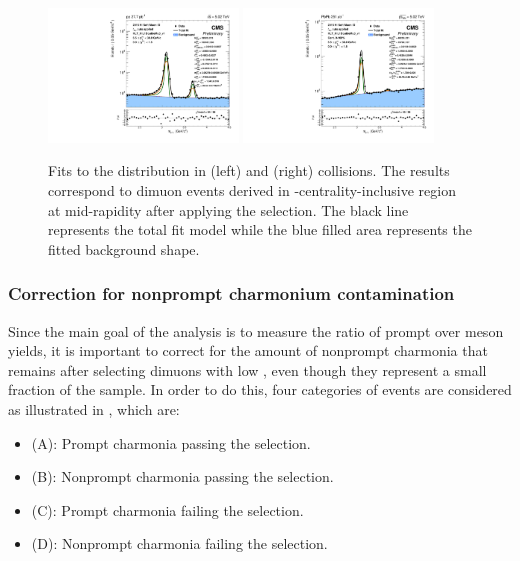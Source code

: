 \begin{figure}[htb!]
 \centering
 \includegraphics[width=0.45\textwidth]{Figures/Charmonia/Analysis/PsiPSignalExtraction/mass/DATA_Psi2SJpsi_PP_Jpsi_DoubleCrystalBall_Psi2S_DoubleCrystalBall_pt65300_rap016_cent0200.pdf}
 \includegraphics[width=0.45\textwidth]{Figures/Charmonia/Analysis/PsiPSignalExtraction/mass/DATA_Psi2SJpsi_PbPb_Jpsi_DoubleCrystalBall_Psi2S_DoubleCrystalBall_pt65300_rap016_cent0200.pdf}
\caption{Fits to the \mMuMu distribution in \Runpp (left) and \RunPbPb (right) collisions. The results correspond to dimuon events derived in \pt-centrality-inclusive region at mid-rapidity after applying the \ctau selection. The black line represents the total fit model while the blue filled area represents the fitted background shape.}
 \label{fig:MassPsiP}
\end{figure}


\subsubsection{Correction for nonprompt charmonium contamination}\label{sec:Charmonia_Analysis_PsiPYieldExtraction_NonPromptCorr}

Since the main goal of the analysis is to measure the ratio of prompt \PsiP over \JPsi meson yields, it is important to correct for the amount of nonprompt charmonia that remains after selecting dimuons with low \ctau, even though they represent a small fraction of the sample. In order to do this, four categories of events are considered as illustrated in , which are:

\begin{itemize}
 \item (A): Prompt charmonia passing the \ctau selection.
 \item (B): Nonprompt charmonia passing the \ctau selection.
 \item (C): Prompt charmonia failing the \ctau selection.
 \item (D): Nonprompt charmonia failing the \ctau selection.
\end{itemize}

